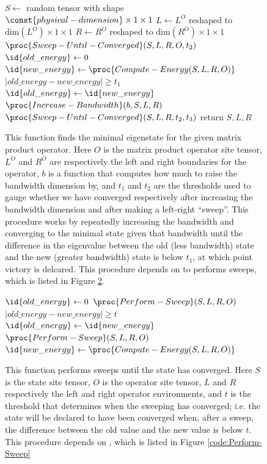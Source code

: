 \documentclass{article}
\begin{document}
\begin{figure}
\begin{codebox}
\li $S \gets$ random tensor with shape $\const{physical-dimension}\times1\times 1$
\li $L \gets L^O$ reshaped to $\text{dim}(L^O)\times1\times1$
\li $R \gets R^O$ reshaped to $\text{dim}(R^O)\times1\times1$
\li $\proc{Sweep-Until-Converged}(S,L,R,O,t_2)$
\li $\id{old\_energy} \gets 0$
\li $\id{new\_energy} \gets  \proc{Compute-Energy(S,L,R,O)}$
\li \While $|old\_energy-new\_energy| \ge t_1$
\li     \Do
\li         $\id{old\_energy} \gets \id{new\_energy}$
\li         $\proc{Increase-Bandwidth}(b,S,L,R)$
\li         $\proc{Sweep-Until-Converged}(S,L,R,t_2,t_3)$
\End
\li return $S,L,R$
\end{codebox}
\caption{\label{code:Compute-Ground-State} This function finds the minimal eigenstate for the given matrix product operator.  Here $O$ is the matrix product operator site tensor, $L^O$ and $R^O$ are respectively the left and right boundaries for the operator, $b$ is a function that computes how much to raise the bandwidth dimension by, and $t_1$ and $t_2$ are the thresholds used to gauge whether we have converged respectively after increasing the bandwidth dimension and after making a left-right ``sweep''.  This procedure works by repeatedly increasing the bandwidth and converging to the minimal state given that bandwidth until the difference in the eigenvalue between the old (less bandwidth) state and the new (greater bandwidth) state is below $t_1$, at which point victory is delcared. This procedure depends on  to performs sweeps, which is listed in Figure \ref{code:Sweep-Until-Converged}.}
\end{figure}

\begin{figure}
\begin{codebox}
\li $\id{old\_energy} \gets 0$
\li $\proc{Perform-Sweep}(S,L,R,O)$
\li \While $|old\_energy-new\_energy| \ge t$
\li     \Do
\li         $\id{old\_energy} \gets \id{new\_energy}$
\li         $\proc{Perform-Sweep}(S,L,R,O)$
\li         $\id{new\_energy} \gets  \proc{Compute-Energy(S,L,R,O)}$
\end{codebox}
\caption{\label{code:Sweep-Until-Converged} This function performs sweeps until the state has converged. Here $S$ is the state site tensor, $O$ is the operator site tensor, $L$ and $R$ respectively the left and right operator environments, and $t$ is the threshold that determines when the sweeping has converged; i.e. the state will be declared to have been converged when, after a sweep, the difference between the old value and the new value is below $t$.  This procedure depends on , which is listed in Figure \ref{code:Perform-Sweep}}
\end{figure}
\end{document}
